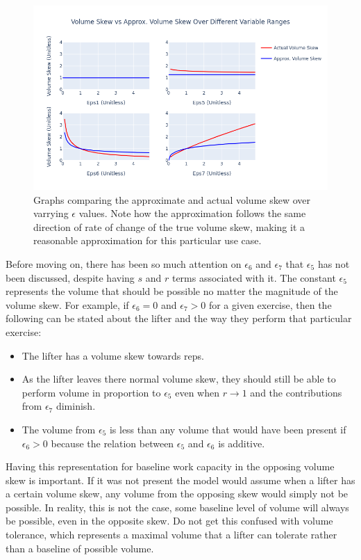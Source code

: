 \begin{figure}[htb]
    \centering
    \includegraphics[scale=0.55]{images/ch3/ApproxVsActualVolumeSkew.basic.png}
    \caption{Graphs comparing the approximate and actual volume skew over varrying $\epsilon$ values. Note how the approximation follows the same direction of rate of change of the true volume skew, making it a reasonable approximation for this particular use case.}
    \label{fig:ApproximateVsActualVolumeSkew}
\end{figure}

Before moving on, there has been so much attention on $\epsilon_6$ and $\epsilon_7$ that $\epsilon_5$ has not been discussed, despite having $s$ and $r$ terms associated with it. The constant $\epsilon_5$ represents the volume that should be possible no matter the magnitude of the volume skew. For example, if $\epsilon_6=0$ and $\epsilon_7>0$ for a given exercise, then the following can be stated about the lifter and the way they perform that particular exercise:

\begin{itemize}
    \item The lifter has a volume skew towards reps.
    \item As the lifter leaves there normal volume skew, they should still be able to perform volume in proportion to $\epsilon_5$ even when $r\to 1$ and the contributions from $\epsilon_7$ diminish.
    \item The volume from $\epsilon_5$ is less than any volume that would have been present if $\epsilon_6>0$ because the relation between $\epsilon_5$ and $\epsilon_6$ is additive.
\end{itemize}

Having this representation for baseline work capacity in the opposing volume skew is important. If it was not present the model would assume when a lifter has a certain volume skew, any volume from the opposing skew would simply not be possible. In reality, this is not the case, some baseline level of volume will always be possible, even in the opposite skew. Do not get this confused with volume tolerance, which represents a maximal volume that a lifter can tolerate rather than a baseline of possible volume.

